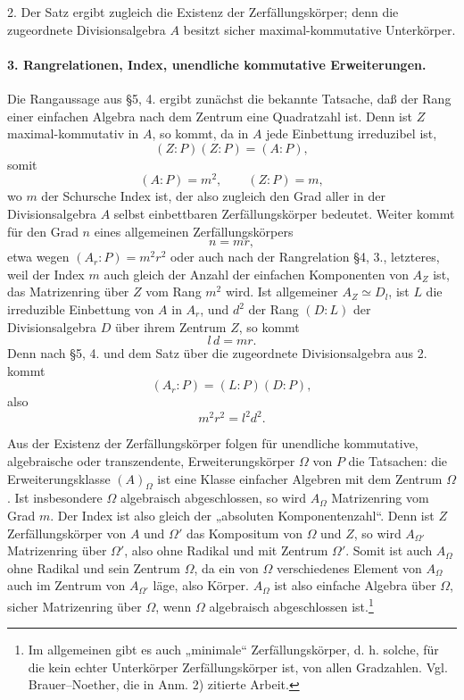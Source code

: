 \documentclass[11pt]{article}
\begin{document}
2. Der Satz ergibt zugleich die Existenz der Zerfällungskörper; denn die zugeordnete Divisionsalgebra \(A\) besitzt sicher maximal-kommutative Unterkörper.

\paragraph{3. Rangrelationen, Index, unendliche kommutative Erweiterungen.}
Die Rangaussage aus §5, 4. ergibt zunächst die bekannte Tatsache, daß der Rang einer einfachen Algebra nach dem Zentrum eine Quadratzahl ist. Denn ist \(Z\) maximal-kommutativ in \(A\), so kommt, da in \(A\) jede Einbettung irreduzibel ist,
\[
        (Z:P)(Z:P)=(A:P),
\]
somit
\[
        (A:P)=m^2,\qquad (Z:P)=m,
\]
wo \(m\) der Schursche Index ist, der also zugleich den Grad aller in der Divisionsalgebra \(A\) selbst einbettbaren Zerfällungskörper bedeutet. Weiter kommt für den Grad \(n\) eines allgemeinen Zerfällungskörpers
\[
        n=mr,
\]
etwa wegen \((A_r:P)=m^2r^2\) oder auch nach der Rangrelation §4, 3., letzteres, weil der Index \(m\) auch gleich der Anzahl der einfachen Komponenten von \(A_Z\) ist, das Matrizenring über \(Z\) vom Rang \(m^2\) wird. Ist allgemeiner \(A_Z\simeq D_l\), ist \(L\) die irreduzible Einbettung von \(A\) in \(A_r\), und \(d^2\) der Rang \((D:L)\) der Divisionsalgebra \(D\) über ihrem Zentrum \(Z\), so kommt
\[
        l\,d=mr .
\]
Denn nach §5, 4. und dem Satz über die zugeordnete Divisionsalgebra aus 2. kommt
\[
        (A_r:P)=(L:P)(D:P),
\]
also
\[
        m^2r^2=l^2d^2 .
\]

Aus der Existenz der Zerfällungskörper folgen für unendliche kommutative, algebraische oder transzendente, Erweiterungskörper \(\Omega\) von \(P\) die Tatsachen: die Erweiterungsklasse \((A)_\Omega\) ist eine Klasse einfacher Algebren mit dem Zentrum \(\Omega\). Ist insbesondere \(\Omega\) algebraisch abgeschlossen, so wird \(A_\Omega\) Matrizenring vom Grad \(m\). Der Index ist also gleich der „absoluten Komponentenzahl“. Denn ist \(Z\) Zerfällungskörper von \(A\) und \(\Omega'\) das Kompositum von \(\Omega\) und \(Z\), so wird \(A_{\Omega'}\) Matrizenring über \(\Omega'\), also ohne Radikal und mit Zentrum \(\Omega'\). Somit ist auch \(A_\Omega\) ohne Radikal und sein Zentrum \(\Omega\), da ein von \(\Omega\) verschiedenes Element von \(A_\Omega\) auch im Zentrum von \(A_{\Omega'}\) läge, also Körper. \(A_\Omega\) ist also einfache Algebra über \(\Omega\), sicher Matrizenring über \(\Omega\), wenn \(\Omega\) algebraisch abgeschlossen ist.\footnote{Im allgemeinen gibt es auch „minimale“ Zerfällungskörper, d. h. solche, für die kein echter Unterkörper Zerfällungskörper ist, von allen Gradzahlen. Vgl. Brauer--Noether, die in Anm. 2) zitierte Arbeit.}
\end{document}

